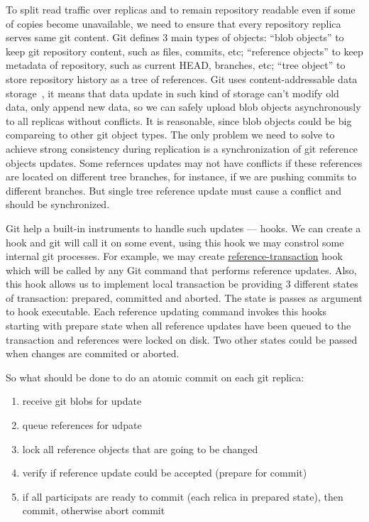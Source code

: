 \documentclass[acmlarge, screen, nonacm]{acmart}
\begin{document}
To split read traffic over replicas and to remain repository readable even if some of copies become unavailable,
we need to ensure that every repository replica serves same git content.
Git defines 3 main types of objects: ``blob objects'' to keep git repository content, such as files, commits, etc;
``reference objects'' to keep metadata of repository, such as current HEAD, branches, etc; ``tree object'' to
store repository history as a tree of references. Git uses content-addressable
data storage~\cite{content-addressable-storage},
it means that data update in such kind of storage can't modify old data, only append new data, so we can safely
upload blob objects asynchronously to all replicas without conflicts.
It is reasonable, since blob objects could be big compareing to
other git object types. The only problem we need to solve to achieve strong consistency during replication
is a synchronization of git reference objects updates. Some refernces updates may not have conflicts if these references
are located on different tree branches, for instance, if we are pushing commits to different branches. But
single tree reference update must cause a conflict and should be synchronized.

Git help a built-in instruments to handle such updates --- hooks. We can create a hook and git will call it on some event,
using this hook we may constrol some internal git processes. For example, we may create
\href{https://git-scm.com/docs/githooks.html\#\_reference\_transaction}{reference-transaction} hook
which will be called by any Git command that performs reference updates. Also, this hook allows us to implement
local transaction be providing 3 different states of transaction: prepared, committed and aborted.
The state is passes as argument to hook executable.
Each reference updating command invokes this hooks starting with prepare state when all reference updates
have been queued to the transaction and references were locked on disk. Two other states could be passed
when changes are commited or aborted.

So what should be done to do an atomic commit on each git replica:
\begin{enumerate}
  \item receive git blobs for update
  \item queue references for udpate
  \item lock all reference objects that are going to be changed
  \item verify if reference update could be accepted (prepare for commit)
  \item if all participats are ready to commit (each relica in prepared state), then commit, otherwise abort commit
\end{enumerate}
\end{document}

